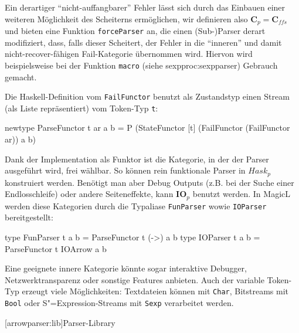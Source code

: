 \documentclass[11pt, a4paper, bibgerm]{book}
\newcommand\icode[1]{\lstinline?#1?}
\newcommand\lsection{}
\newcommand\sref{}
\newcommand{\sees}[1]{(siehe \sref{#1})}
\newcommand{\sexp}{S"=Expression}
\begin{document}
Ein derartiger "`nicht-auffangbarer"' Fehler lässt sich durch das
Einbauen einer weiteren Möglichkeit des Scheiterns ermöglichen, wir
definieren also $\mathbf{C}_p = \mathbf{C}_{ffs}$ und bieten eine
Funktion \icode{forceParser} an, die einen (Sub-)Parser derart
modifiziert, dass, falls dieser Scheitert, der Fehler in die "`inneren"'
und damit nicht-recover-fähigen Fail-Kategorie übernommen wird. Hiervon
wird beispielsweise bei der Funktion \icode{macro}
\sees{sexpproc:sexpparser} Gebrauch gemacht.

Die Haskell-Definition vom \icode{FailFunctor} benutzt als Zustandstyp
einen Stream (als Liste repräsentiert) vom Token-Typ \icode{t}:

\begin{code}
newtype ParseFunctor t ar a b =
  P (StateFunctor
     [t]
     (FailFunctor (FailFunctor ar))
     a
     b)
\end{code}

Dank der Implementation als Funktor ist die Kategorie, in der der Parser
ausgeführt wird, frei wählbar. So können rein funktionale Parser in
$Hask_p$ konstruiert werden. Benötigt man aber Debug Outputs (z.B. bei
der Suche einer Endlosschleife) oder andere Seiteneffekte, kann
$\mathbf{IO}_p$ benutzt werden. In MagicL werden diese Kategorien durch
die Typaliase \icode{FunParser} wowie \icode{IOParser} bereitgestellt:
\begin{code}
type FunParser t a b = ParseFunctor t (->) a b
type IOParser  t a b = ParseFunctor t IOArrow a b
\end{code}
Eine geeignete innere Kategorie könnte
sogar interaktive Debugger, Netzwerktransparenz oder sonstige Features
anbieten. Auch der variable Token-Typ erzeugt viele Möglichkeiten:
Textdateien können mit \icode{Char}, Bitstreams mit \icode{Bool} oder
\sexp{}-Streams mit \icode{Sexp} verarbeitet werden.

\lsection[arrowparser:lib]{Parser-Library}
\end{document}
